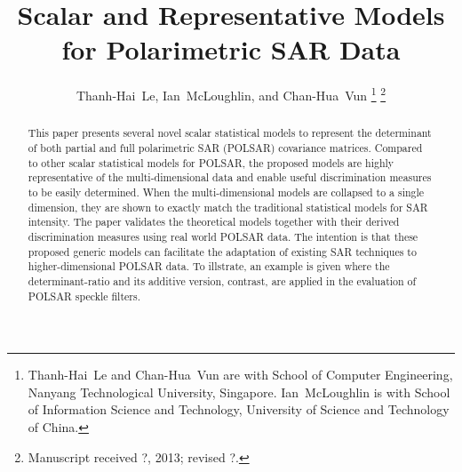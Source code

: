 \documentclass[journal]{IEEEtran}
\title{
  Scalar and Representative Models for Polarimetric SAR Data
}
\author{Thanh-Hai~Le,
        Ian~McLoughlin, 
	and Chan-Hua~Vun%
\thanks{Thanh-Hai~Le and Chan-Hua~Vun are with School of Computer Engineering, 
Nanyang Technological University, Singapore. Ian~McLoughlin is with School of Information Science and Technology,
University of Science and Technology of China.
}%
\thanks{Manuscript received ?, 2013; revised ?.}}
\begin{document}
\maketitle

\begin{abstract}
This paper presents several novel scalar statistical models to represent the determinant of both partial and full polarimetric SAR (POLSAR) covariance matrices.
Compared to other scalar statistical models for POLSAR,
  the proposed models are highly representative of the multi-dimensional data
  and enable useful discrimination measures to be easily determined. %
When the multi-dimensional models are collapsed to a single dimension,
  they are shown to exactly match the traditional statistical models for SAR intensity.
The paper validates the theoretical models together with their derived discrimination measures using real world POLSAR data.  
The intention is that these proposed generic models can facilitate the adaptation of existing SAR techniques to higher-dimensional POLSAR data.
To illstrate, an example is given where the determinant-ratio and its additive version, contrast, are applied in the evaluation of POLSAR speckle filters.

\end{abstract}
\end{document}
